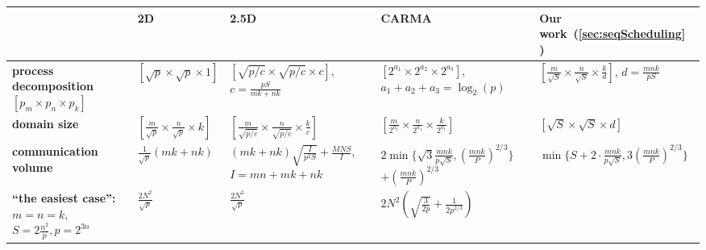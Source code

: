 \documentclass[sigplan,review,anonymous]{acmart}\settopmatter{printfolios=true,printccs=false,printacmref=false}
\begin{document}
\begin{table}
%
\setlength{\tabcolsep}{4pt}
\renewcommand{\arraystretch}{2}
\centering
\scriptsize
\sf
%
\begin{tabular}{lllll}
%
\toprule
%
 & \textbf{2D~\cite{summa}} & \textbf{2.5D~\cite{25d}} & 
 \textbf{CARMA~\cite{CARMA}} & \textbf{Our work~(\cref{sec:seqScheduling} )} \\
%
\midrule
%
\makecell[l]{\textbf{process}\\
\textbf{decomposition} \\
$\left[p_m \times p_n \times p_k\right]$}
&
$\left[\sqrt{p} \times \sqrt{p} \times 1\right]$
&
\makecell[l]{$\left[\sqrt{p/c} \times \sqrt{p/c} \times c\right]$,\\
$c = \frac{pS}{mk + nk}$}
& 
\makecell[l]{$\left[{2^{a_1}} \times {2^{a_2}} \times {2^{a_3}}\right]$,\\
$a_1 + a_2 + a_3 = \log_2(p)$}
& 
\makecell[l]{$\left[\frac{m}{\sqrt{S}} \times \frac{n}{\sqrt{S}} \times 
\frac{k}{d}\right]$,\\
$d = \frac{mnk}{pS}$}
%
\vspace{1.0em}
%
\\
%
%
\textbf{domain size}
&
$\left[\frac{m}{\sqrt{p}} \times \frac{n}{\sqrt{p}} \times k\right]$ 
&
$\left[\frac{m}{\sqrt{p/c}} \times \frac{n}{\sqrt{p/c}} \times 
\frac{k}{c}\right]$
&
$\left[\frac{m}{2^{a_1}} \times \frac{n}{2^{a_1}} \times 
\frac{k}{2^{a_1}}\right]$
& 
$\left[{\sqrt{S}} \times {\sqrt{S}} \times {d}\right]$
%
\vspace{0.5em}
%
\\
%
\midrule
%
\makecell[l]{\textbf{communication}\\
\textbf{volume}}
&
$\frac{1}{\sqrt{p}} \left(mk + nk\right)$
&
\makecell[l]{$(mk + nk)\sqrt{\frac{I}{p^2S}} + \frac{MNS}{I}$, \\
$I = mn + mk + nk$}
&
\makecell[l]{$2\min \Big\{\sqrt{3} \frac{mnk}{p\sqrt{S}},
	\left(\frac{mnk}{P}\right)^{2/3} \Big\} $ \\
	$ + \left(\frac{mnk}{P}\right)^{2/3}$}
& 
$\min \Big\{S + 2 \cdot \frac{mnk}{p\sqrt{S}}, 3 
\left(\frac{mnk}{P}\right)^{2/3} \Big\}$
%
\vspace{0.5em}
%
\\
%
\midrule
%
\makecell[l]{\textbf{``the easiest case'':}\\
$m = n = k$,\\
$S = 2\frac{n^2}{p}, p=2^{3n}$}
&
$\frac{2N^2 }{\sqrt{p}}$
&
$\frac{2N^2 }{\sqrt{p}}$
&
$2N^2 \left(\sqrt{\frac{3}{2p}} + \frac{1}{2p^{2/3}} \right)$

\end{tabular}
\end{table}
\end{document}

